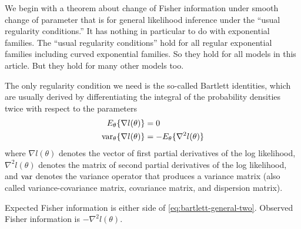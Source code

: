 We begin with a theorem about change of Fisher information under smooth change
of parameter that is for general likelihood inference under the ``usual
regularity conditions.''  It has nothing in particular to do with
exponential families.  The ``usual regularity conditions'' hold for all
regular exponential families including curved exponential families.
So they hold for all models in this article.   But they hold for many
other models too.

The only regularity condition we need is the so-called Bartlett identities,
which are usually derived by differentiating the integral of the probability
densities twice with respect to the parameters
\begin{align}
   E_\theta\{ \nabla l(\theta) \} & = 0
   \label{eq:bartlett-general-one}
   \\
   \operatorname{var}_\theta\{ \nabla l(\theta) \} & = - E_\theta \{ \nabla^2 l(\theta) \}
   \label{eq:bartlett-general-two}
\end{align}
where $\nabla l(\theta)$ denotes the vector of first partial derivatives
of the log likelihood, $\nabla^2 l(\theta)$ denotes the matrix of second
partial derivatives of the log likelihood,
and $\operatorname{var}$ denotes the variance operator that produces a variance matrix
(also called variance-covariance matrix, covariance matrix,
and dispersion matrix).

Expected Fisher information is either side of \eqref{eq:bartlett-general-two}.
Observed Fisher information is $- \nabla^2 l(\theta)$.

